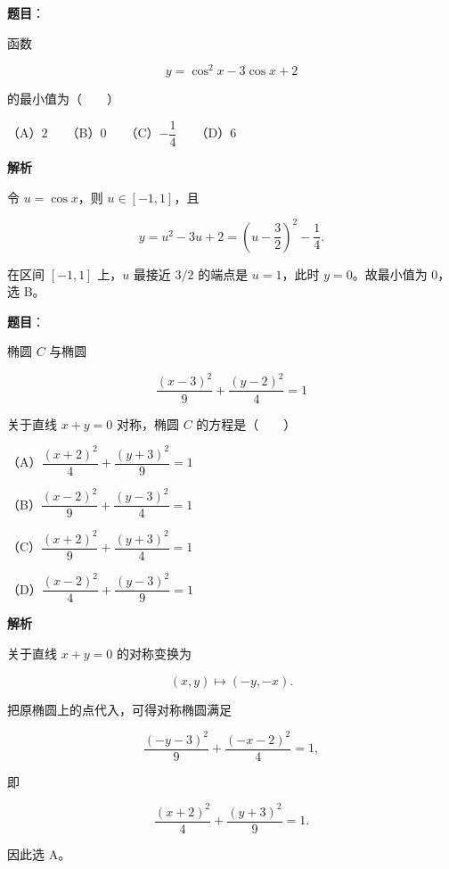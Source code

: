 \begin{answer}

\textbf{题目}：

函数

\nopagebreak[4]
\[
y=\cos^2x-3\cos x+2
\]

的最小值为\mbox{（　　）}

（A）$2$　　（B）$0$　　（C）$-\dfrac14$　　（D）$6$

\textbf{解析}

令 $u=\cos x$，则 $u\in[-1,1]$，且

\nopagebreak[4]
\[
y=u^2-3u+2=\left(u-\frac32\right)^2-\frac14.
\]

在区间 $[-1,1]$ 上，$u$ 最接近 $3/2$ 的端点是 $u=1$，此时 $y=0$。故最小值为 $0$，选 B。


\end{answer}
\begin{answer}

\textbf{题目}：

椭圆 $C$ 与椭圆

\nopagebreak[4]
\[
\dfrac{(x-3)^2}{9}+\dfrac{(y-2)^2}{4}=1
\]

关于直线 $x+y=0$ 对称，椭圆 $C$ 的方程是\mbox{（　　）}

（A）$\dfrac{(x+2)^2}{4}+\dfrac{(y+3)^2}{9}=1$

（B）$\dfrac{(x-2)^2}{9}+\dfrac{(y-3)^2}{4}=1$

（C）$\dfrac{(x+2)^2}{9}+\dfrac{(y+3)^2}{4}=1$

（D）$\dfrac{(x-2)^2}{4}+\dfrac{(y-3)^2}{9}=1$

\textbf{解析}

关于直线 $x+y=0$ 的对称变换为

\nopagebreak[4]
\[
(x,y)\longmapsto(-y,-x).
\]

把原椭圆上的点代入，可得对称椭圆满足

\nopagebreak[4]
\[
\frac{(-y-3)^2}{9}+\frac{(-x-2)^2}{4}=1,
\]

即

\nopagebreak[4]
\[
\frac{(x+2)^2}{4}+\frac{(y+3)^2}{9}=1.
\]

因此选 A。


\end{answer}
